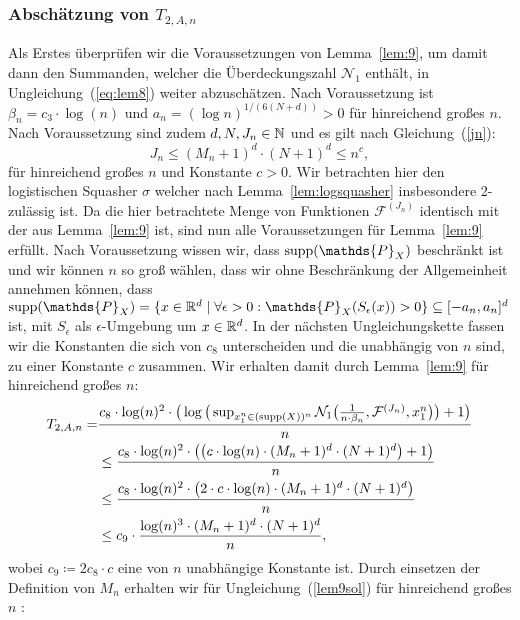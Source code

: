 {\subsubsection{Abschätzung von $T_{2,A,n}$}
Als Erstes überprüfen wir die Voraussetzungen von Lemma~\ref{lem:9}, um damit dann den Summanden, welcher die Überdeckungszahl $\mathcal{N}_1$ enthält, in Ungleichung~(\ref{eq:lem8}) weiter abzuschätzen.
Nach Voraussetzung ist $\beta_n = c_3 \cdot \log(n)$ und $a_n = (\log n)^{1/(6(N + d))} > 0$ für hinreichend großes $n$. Nach Voraussetzung sind zudem $d, N, J_n \in \mathbb{N}$ und es gilt nach Gleichung~(\ref{jn}): 
$$J_n \leq (M_n + 1)^d \cdot (N + 1)^d \leq n^{c},$$
für hinreichend großes $n$ und Konstante $c > 0$. Wir betrachten hier den logistischen Squasher $\sigma$ welcher nach Lemma~\ref{lem:logsquasher} insbesondere 2-zulässig ist. Da die hier betrachtete Menge von Funktionen $\mathcal{F}^{(J_n)}$ identisch mit der aus Lemma~\ref{lem:9} ist, sind nun alle Voraussetzungen für Lemma~\ref{lem:9} erfüllt. Nach Voraussetzung wissen wir, dass $\supp(\mathds{P}_X)$ beschränkt ist und wir können $n$ so groß wählen, dass wir ohne Beschränkung der Allgemeinheit annehmen können, dass $\supp(\mathds{P}_X) = \{x \in \R^d \mid \forall \epsilon > 0 : \mathds{P}_X(S_{\epsilon}(x)) > 0\} \subseteq [-a_n, a_n]^d$ ist, mit $S_{\epsilon}$ als $\epsilon$-Umgebung um $x \in \mathbb{R}^d$. In der nächsten Ungleichungskette fassen wir die Konstanten die sich von $c_8$ unterscheiden und die unabhängig von $n$ sind, zu einer Konstante $c$ zusammen. Wir erhalten damit durch Lemma~\ref{lem:9} für hinreichend großes $n$:
\begin{equation}
\label{lem9sol}
\begin{split}
T_{2,A,n} = & \frac{c_8 \cdot \log(n)^2 \cdot \big(\log\big(\sup_{x_1^n \in (\operatorname{supp}(X))^n}\mathcal{N}_1\big(\frac{1}{n \cdot \beta_n},\mathcal{F}^{(J_n)},x_1^n\big)\big) + 1\big)}{n} \\
& \leq \frac{c_8 \cdot \log(n)^2 \cdot \big(\big(c \cdot \log(n) \cdot (M_n + 1)^d \cdot (N + 1)^d \big) + 1\big)}{n} \\
& \leq \frac{c_8 \cdot \log(n)^2 \cdot \big(2 \cdot c \cdot \log(n) \cdot (M_n + 1)^d \cdot (N + 1)^d\big)}{n} \\
& \leq c_{9} \cdot \frac{\log(n)^3 \cdot (M_n + 1)^d \cdot (N + 1)^d}{n},
\end{split}
\end{equation}
wobei $c_9 \coloneqq 2 c_8 \cdot c$ eine von $n$ unabhängige Konstante ist.
Durch einsetzen der Definition von $M_n$ erhalten wir für Ungleichung~(\ref{lem9sol}) für hinreichend großes $n$ :
}
